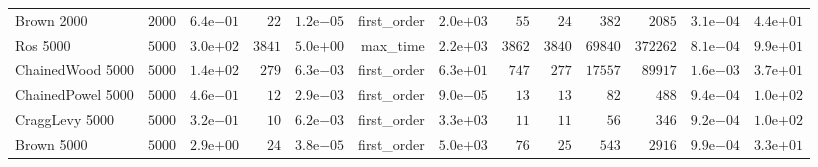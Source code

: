 \begin{longtable}[c]{lrrrrrrrrrrrr}
Brown 2000 & \( 2000\) & \( 6.4\)e\(-01\) & \(   22\) & \( 1.2\)e\(-05\) & first\_order & \( 2.0\)e\(+03\) & \(   55\) & \(   24\) & \(  382\) & \( 2085\) & \( 3.1\)e\(-04\) & \( 4.4\)e\(+01\) \\
Ros 5000 & \( 5000\) & \( 3.0\)e\(+02\) & \( 3841\) & \( 5.0\)e\(+00\) & max\_time & \( 2.2\)e\(+03\) & \( 3862\) & \( 3840\) & \(69840\) & \(372262\) & \( 8.1\)e\(-04\) & \( 9.9\)e\(+01\) \\
ChainedWood 5000 & \( 5000\) & \( 1.4\)e\(+02\) & \(  279\) & \( 6.3\)e\(-03\) & first\_order & \( 6.3\)e\(+01\) & \(  747\) & \(  277\) & \(17557\) & \(89917\) & \( 1.6\)e\(-03\) & \( 3.7\)e\(+01\) \\
ChainedPowel 5000 & \( 5000\) & \( 4.6\)e\(-01\) & \(   12\) & \( 2.9\)e\(-03\) & first\_order & \( 9.0\)e\(-05\) & \(   13\) & \(   13\) & \(   82\) & \(  488\) & \( 9.4\)e\(-04\) & \( 1.0\)e\(+02\) \\
CraggLevy 5000 & \( 5000\) & \( 3.2\)e\(-01\) & \(   10\) & \( 6.2\)e\(-03\) & first\_order & \( 3.3\)e\(+03\) & \(   11\) & \(   11\) & \(   56\) & \(  346\) & \( 9.2\)e\(-04\) & \( 1.0\)e\(+02\) \\
Brown 5000 & \( 5000\) & \( 2.9\)e\(+00\) & \(   24\) & \( 3.8\)e\(-05\) & first\_order & \( 5.0\)e\(+03\) & \(   76\) & \(   25\) & \(  543\) & \( 2916\) & \( 9.9\)e\(-04\) & \( 3.3\)e\(+01\) \\
\hline 
\end{longtable}



